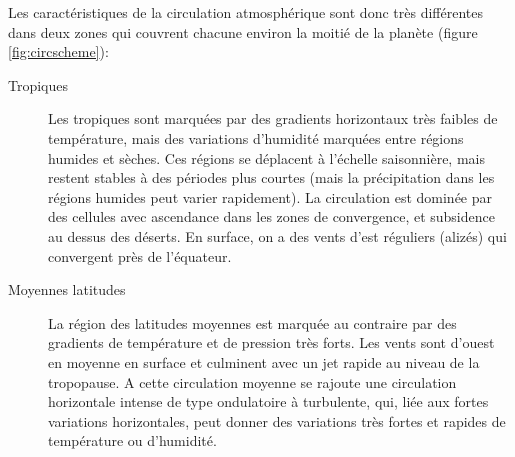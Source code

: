 \sk
Les caractéristiques de la circulation atmosphérique sont donc très différentes dans deux zones qui couvrent chacune environ la moitié de la planète (figure \ref{fig:circscheme}):
\begin{description}
\item[Tropiques] Les tropiques sont marquées par des gradients horizontaux très faibles de température, mais des variations d'humidité marquées entre régions humides et sèches. Ces régions se déplacent à l'échelle saisonnière, mais restent stables à des périodes plus courtes (mais la précipitation dans les régions humides peut varier rapidement). La circulation est dominée par des cellules avec ascendance dans les zones de convergence, et subsidence au dessus des déserts. En surface, on a des vents d'est réguliers (alizés) qui convergent près de l'équateur.
\item[Moyennes latitudes] La région des latitudes moyennes est marquée au contraire par des gradients de température et de pression très forts. Les vents sont d'ouest en moyenne en surface et culminent avec un jet rapide au niveau de la tropopause. A cette circulation moyenne se rajoute une circulation horizontale intense de type ondulatoire à turbulente, qui, liée aux fortes variations horizontales, peut donner des variations très fortes et rapides de température ou d'humidité.
\end{description}



%

